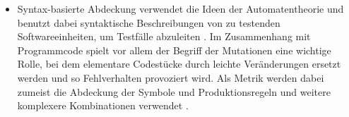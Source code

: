 \begin{itemize}
\item Syntax-basierte Abdeckung verwendet die Ideen der Automatentheorie und benutzt dabei syntaktische Beschreibungen von zu testenden Softwareeinheiten, um Testfälle abzuleiten \cite[S. 170 ff.]{ammann2008introduction}. Im Zusammenhang mit Programmcode spielt vor allem der Begriff der Mutationen eine wichtige Rolle, bei dem elementare Codestücke durch leichte Veränderungen ersetzt werden und so Fehlverhalten provoziert wird. Als Metrik werden dabei zumeist die Abdeckung der Symbole und Produktionsregeln und weitere komplexere Kombinationen verwendet \cite[S. 172]{ammann2008introduction}.
\end{itemize}

